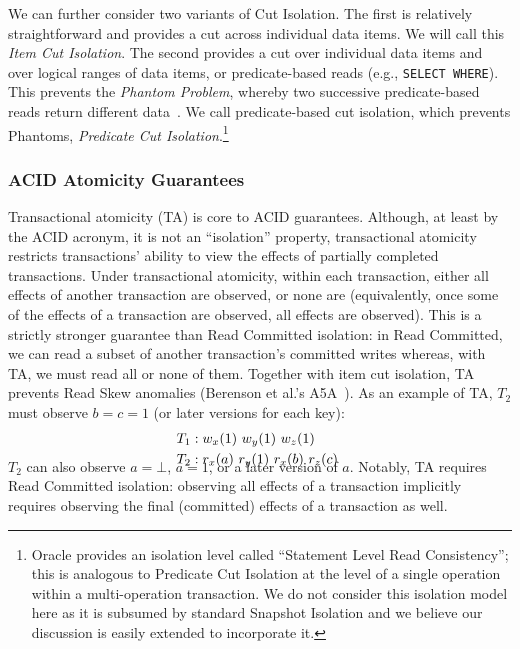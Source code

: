 We can further consider two variants of Cut Isolation. The first is
relatively straightforward and provides a cut across individual data
items. We will call this \textit{Item Cut Isolation}. The second
provides a cut over individual data items and over logical ranges of
data items, or predicate-based reads (e.g., \texttt{SELECT
  WHERE}). This prevents the \textit{Phantom Problem}, whereby two
successive predicate-based reads return different
data~\cite{gray-isolation}. We call predicate-based cut isolation,
which prevents Phantoms, \textit{Predicate Cut
  Isolation}.\footnote{Oracle provides an isolation level called
  ``Statement Level Read Consistency''; this is analogous to Predicate
  Cut Isolation at the level of a single operation within a
  multi-operation transaction. We do not consider this isolation model
  here as it is subsumed by standard Snapshot Isolation and we believe
  our discussion is easily extended to incorporate it.}

\subsubsection{ACID Atomicity Guarantees}

Transactional atomicity (TA) is core to ACID guarantees. Although, at
least by the ACID acronym, it is not an ``isolation'' property,
transactional atomicity restricts transactions' ability to view the
effects of partially completed transactions. Under transactional
atomicity, within each transaction, either all effects of another
transaction are observed, or none are (equivalently, once some of the
effects of a transaction are observed, all effects are observed). This
is a strictly stronger guarantee than Read Committed isolation: in
Read Committed, we can read a subset of another transaction's
committed writes whereas, with TA, we must read all or none of
them. Together with item cut isolation, TA prevents Read Skew
anomalies (Berenson et al.'s A5A~\cite{ansicritique}). As an example
of TA, $T_2$ must observe $b=c=1$ (or later versions for each key):
\vspace{-.5em}
\begin{align*}
\small
T_1 &: w_x(1)~w_y(1)~w_z(1)
\\T_2 &: r_x(a)~r_y(1)~r_x(b)~r_z(c)~\\[-1.5em]
\end{align*}
$T_2$ can also observe $a=\bot$, $a=1$, or a later version of
$a$. Notably, TA requires Read Committed isolation: observing all
effects of a transaction implicitly requires observing the final
(committed) effects of a transaction as well.

